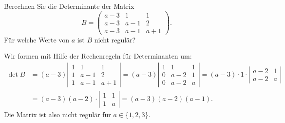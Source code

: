 Berechnen Sie die Determinante der Matrix
\[
B
=
\begin{pmatrix}
a-3&  1&  1\\
a-3&a-1&  2\\
a-3&a-1&a+1
\end{pmatrix}.
\]
Für welche Werte von $a$ ist $B$ nicht regulär?


\begin{loesung}
Wir formen mit Hilfe der Rechenregeln für Determinanten um:
\begin{align*}
\det B
&=
(a-3)\left|\begin{matrix}
1&  1&  1\\
1&a-1&  2\\
1&a-1&a+1
\end{matrix}\right|
=
(a-3)\left|\begin{matrix}
1&  1&  1\\
0&a-2&  1\\
0&a-2&a
\end{matrix}\right|
=
(a-3)\cdot 1\cdot
\left|\begin{matrix}
a-2&  1\\
a-2&  a
\end{matrix}\right|
\\
&=
(a-3)(a-2)\cdot
\left|\begin{matrix}
1&  1\\
1&  a
\end{matrix}\right|
=
(a-3)(a-2)(a-1).
\end{align*}
Die Matrix ist also nicht regulär für $a\in\{1,2,3\}$.
\end{loesung}


